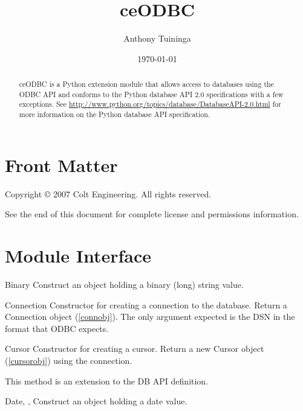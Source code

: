 \documentclass{manual}
\title{ceODBC}
\author{Anthony Tuininga}
\date{\today}                   %
\begin{document}
\maketitle

\ifhtml
\chapter*{Front Matter\label{front}}
\fi

Copyright \copyright{} 2007 Colt Engineering.
All rights reserved.

See the end of this document for complete license and permissions
information.

\begin{abstract}

\noindent
ceODBC is a Python extension module that allows access to databases using the
ODBC API and conforms to the Python database API 2.0 specifications with a few
exceptions.
See \url{http://www.python.org/topics/database/DatabaseAPI-2.0.html} for more
information on the Python database API specification.

\end{abstract}

\tableofcontents

\chapter{Module Interface\label{module}}

\begin{funcdesc}{Binary}{}
  Construct an object holding a binary (long) string value.
\end{funcdesc}

\begin{funcdesc}{Connection}{}
  Constructor for creating a connection to the database. Return a Connection
  object (\ref{connobj}). The only argument expected is the DSN in the format
  that ODBC expects.
\end{funcdesc}

\begin{funcdesc}{Cursor}{}
  Constructor for creating a cursor.  Return a new Cursor object
  (\ref{cursorobj}) using the connection.

   This method is an extension to the DB API definition.
\end{funcdesc}

\begin{funcdesc}{Date}{, , }
  Construct an object holding a date value.
\end{funcdesc}
\end{document}
